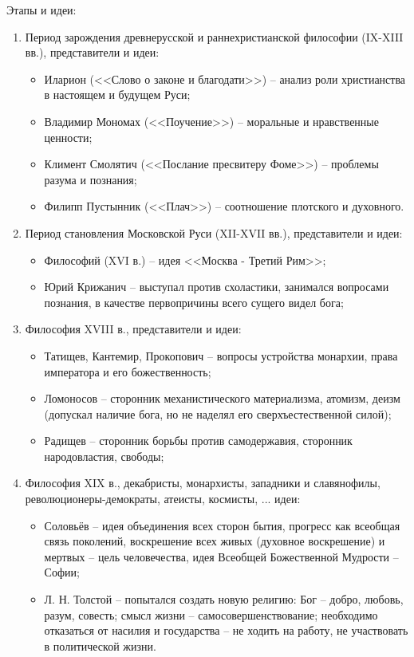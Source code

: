 Этапы и идеи:
\begin{enumerate}
	\itemsep-1ex
	\item Период зарождения древнерусской и раннехристианской философии (IX-XIII вв.), представители и идеи:
	\begin{itemize}
		\itemsep-.5ex
		\item Иларион (<<Слово о законе и благодати>>) -- анализ роли христианства в настоящем и будущем Руси;
		\item Владимир Мономах (<<Поучение>>) -- моральные и нравственные ценности;
		\item Климент Смолятич (<<Послание пресвитеру Фоме>>) -- проблемы разума и познания;
		\item Филипп Пустынник (<<Плач>>) -- соотношение плотского и духовного.
	\end{itemize}
	\item Период становления Московской Руси (XII-XVII вв.), представители и идеи:
	\begin{itemize}
		\itemsep-.5ex
		\item Философий (XVI в.) -- идея <<Москва - Третий Рим>>;
		\item Юрий Крижанич -- выступал против схоластики, занимался вопросами познания, в качестве первопричины всего сущего видел бога;
	\end{itemize}
	\item Философия XVIII в., представители и идеи:
	\begin{itemize}
		\itemsep-.5ex
		\item Татищев, Кантемир, Прокопович -- вопросы устройства монархии, права императора и его божественность;
		\item Ломоносов -- сторонник механистического материализма, атомизм, деизм (допускал наличие бога, но не наделял его сверхъестественной силой);
		\item Радищев -- сторонник борьбы против самодержавия, сторонник народовластия, свободы;
	\end{itemize}
	\item Философия XIX в., декабристы, монархисты, западники и славянофилы, революционеры-де\-мо\-кра\-ты, атеисты, космисты, ... идеи:
	\begin{itemize}
		\itemsep-.5ex
		\item Соловьёв -- идея объединения всех сторон бытия, прогресс как всеобщая связь поколений, воскрешение всех живых (духовное воскрешение) и мертвых -- цель человечества, идея Всеобщей Божественной Мудрости -- Софии;
		\item Л. Н. Толстой -- попытался создать новую религию: Бог -- добро, любовь, разум, совесть; смысл жизни -- самосовершенствование; необходимо отказаться от насилия и государства -- не ходить на работу, не участвовать в политической жизни.

\end{itemize}
\end{enumerate}

